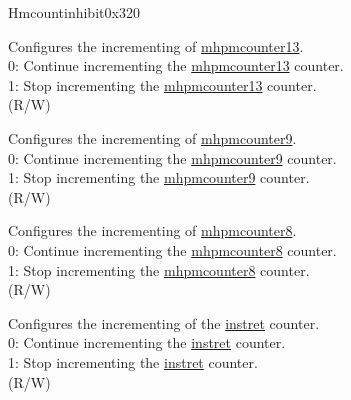 \begin{register}{H}{mcountinhibit}{0x320}\label{regdesc:MCOUNTINHIBIT}
%
%
%
%
%
%
%
%
%
\regnewline%
\begin{regdesc}\begin{reglist}
\label{fielddesc:MCOUNTERINH_HPM_13}\item [{HPM13}] Configures the incrementing of \hyperref[regdesc:MHPMCOUNTER13] {mhpmcounter13}.\\
0: Continue incrementing the \hyperref[regdesc:MHPMCOUNTER13] {mhpmcounter13} counter.\\
1: Stop incrementing the \hyperref[regdesc:MHPMCOUNTER13] {mhpmcounter13} counter.\\
(R/W) 
\label{fielddesc:MCOUNTERINH_HPM_9}\item [{HPM9}] Configures the incrementing of \hyperref[regdesc:MHPMCOUNTER9] {mhpmcounter9}.\\
0: Continue incrementing the \hyperref[regdesc:MHPMCOUNTER9] {mhpmcounter9} counter. \\
1: Stop incrementing the \hyperref[regdesc:MHPMCOUNTER9] {mhpmcounter9} counter. \\
(R/W) 
\label{fielddesc:MCOUNTERINH_HPM_8}\item [{HPM8}] Configures the incrementing of \hyperref[regdesc:MHPMCOUNTER8] {mhpmcounter8}.\\
0: Continue incrementing the \hyperref[regdesc:MHPMCOUNTER8] {mhpmcounter8} counter. \\
1: Stop incrementing the \hyperref[regdesc:MHPMCOUNTER8] {mhpmcounter8} counter. \\
(R/W) 
\label{fielddesc:MCOUNTINHIBIT_IR}\item [IR] Configures the incrementing of the \hyperref[regdesc:INSTRET]{instret} counter. \\
0: Continue incrementing the \hyperref[regdesc:INSTRET]{instret} counter.\\
1: Stop incrementing the \hyperref[regdesc:INSTRET]{instret} counter. \\
(R/W) 


\end{reglist}
\end{regdesc}
\end{register}
